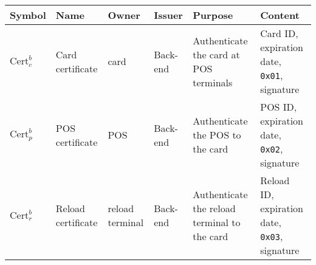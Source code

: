 \begin{tabular}{|l|p{1.7cm}|p{1.5cm}|p{1.5cm}|p{4cm}|p{3cm}|}
\hline
    Symbol & Name & Owner & Issuer & Purpose & Content \\
\hline
    $\textrm{Cert}_c^b$ & Card \mbox{certificate} & card & Back-end & Authenticate the card at POS terminals & Card ID, expiration date, \texttt{0x01}, signature \\
\hline
    $\textrm{Cert}_p^b$ & POS \mbox{certificate} & POS & Back-end & Authenticate the POS to the card & POS ID, expiration date, \texttt{0x02}, signature \\
\hline
    $\textrm{Cert}_r^b$ & Reload \mbox{certificate} & reload terminal & Back-end & Authenticate the reload terminal to the card & Reload ID, expiration date, \texttt{0x03}, signature \\
\hline
\end{tabular}